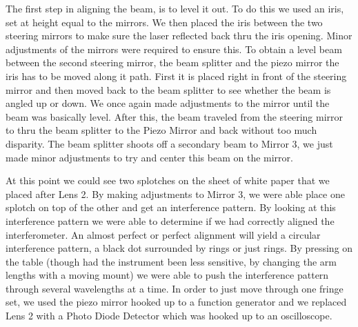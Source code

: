 The first step in aligning the beam, is to level it out. To do this we used an iris, set at height equal to the mirrors. We then placed the iris between the two steering mirrors to make sure the laser reflected back thru the iris opening. Minor adjustments of the mirrors were required to ensure this.  To obtain a level beam between the second steering mirror, the beam splitter and the piezo mirror the iris has to be moved along it path. First it is placed right in front of the steering mirror and then moved back to the beam splitter to see whether the beam is angled up or down. We once again made adjustments to the mirror until the beam was basically level. After this, the beam traveled from the steering mirror to thru the beam splitter to the Piezo Mirror and back without too much disparity. The beam splitter shoots off a secondary beam to Mirror 3, we just made minor adjustments to try and center this beam on the mirror. 

At this point we could see two splotches on the sheet of white paper that we placed after Lens 2. By making adjustments to Mirror 3, we were able place one splotch on top of the other and get an interference pattern. By looking at this interference pattern we were able to determine if we had correctly aligned the interferometer. An almost perfect or perfect alignment will yield a circular interference pattern, a black dot surrounded by rings or just rings. By pressing on the table (though had the instrument been less sensitive, by changing the arm lengths with a moving mount) we were able to push the interference pattern through several wavelengths at a time. In order to just move through one fringe set, we used the piezo mirror hooked up to a function generator and we replaced Lens 2 with a Photo Diode Detector which was hooked up to an oscilloscope.







